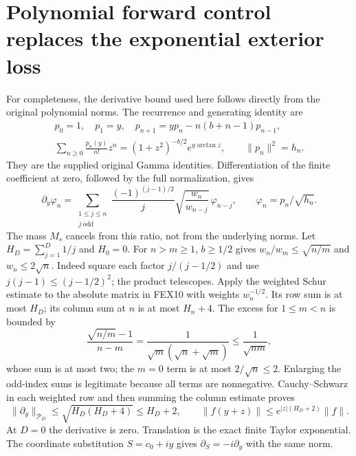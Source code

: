 \documentclass[11pt,a4paper]{article}
\begin{document}
\section{Polynomial forward control replaces the exponential exterior loss}
\label{sec:FEX-forward}
For completeness, the derivative bound used here follows directly from
the original polynomial norms. The recurrence and generating identity are
\[
\begin{gathered}
 p_0=1,\quad p_1=y,\quad
 p_{n+1}=yp_n-n(b+n-1)p_{n-1},\\
 \sum_{n\ge0}\frac{p_n(y)}{n!}z^n
       =(1+z^2)^{-b/2}e^{y\arctan z},\qquad \|p_n\|^2=h_n.
\end{gathered}\tag{FEX9}
\]
They are the supplied original Gamma identities. Differentiation of the
finite coefficient at zero, followed by the full normalization, gives
\[
 \partial_y\varphi_n=
 \sum_{\substack{1\le j\le n\\j\ \mathrm{odd}}}
 \frac{(-1)^{(j-1)/2}}{j}\sqrt{\frac{w_n}{w_{n-j}}}\,
 \varphi_{n-j},\qquad \varphi_n=p_n/\sqrt{h_n}.
 \tag{FEX10}
\]
The mass $M_s$ cancels from this ratio, not from the underlying norms.
Let $H_D=\sum_{j=1}^D1/j$ and $H_0=0$. For $n>m\ge1$, $b\ge1/2$ gives
$w_n/w_m\le\sqrt{n/m}$ and $w_n\le2\sqrt n$. Indeed square each factor
$j/(j-1/2)$ and use $j(j-1)\le(j-1/2)^2$; the product telescopes.
Apply the weighted Schur estimate to the absolute matrix in FEX10 with
weights $w_n^{-1/2}$. Its row sum is at most $H_D$; its column sum at $n$
is at most $H_n+4$. The excess for $1\le m<n$ is bounded by
\[
 \frac{\sqrt{n/m}-1}{n-m}
 =\frac1{\sqrt m(\sqrt n+\sqrt m)}\le\frac1{\sqrt{nm}},
\]
whose sum is at most two; the $m=0$ term is at most $2/\sqrt n\le2$.
Enlarging the odd-index sums is legitimate because all terms are
nonnegative. Cauchy--Schwarz in each weighted row and then summing the
column estimate proves
\[
 \|\partial_y\|_{\mathcal P_D}\le\sqrt{H_D(H_D+4)}\le H_D+2,
 \qquad \|f(y+z)\|\le e^{|z|(H_D+2)}\|f\|.
 \tag{FEX11}
\]
At $D=0$ the derivative is zero. Translation is the exact finite Taylor
exponential. The coordinate substitution $S=c_0+iy$ gives
$\partial_S=-i\partial_y$ with the same norm.
\end{document}
